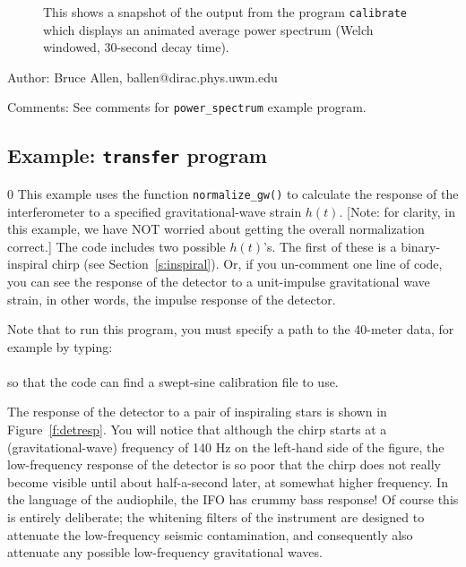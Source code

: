 \begin{figure}[hb]
\begin{center}
\caption{\label{f:calibrate} 
This shows a snapshot of the output from the program {\tt calibrate}
which displays an animated average power spectrum (Welch windowed, 30-second decay time).}
\end{center}
\end{figure}


\begin{description}
\item{Author:}
Bruce Allen, ballen@dirac.phys.uwm.edu
\item{Comments:}
See comments for {\tt power\_spectrum} example program.
\end{description}
\clearpage

\subsection{Example: {\tt transfer} program}
\label{ss:impulse-response}
\setcounter{equation}0
This example uses the function {\tt normalize\_gw()} to calculate the
response of the interferometer to a specified gravitational-wave strain
$h(t)$. [Note: for clarity, in this example, we have NOT worried about
getting the overall normalization correct.] The code includes two
possible $h(t)$'s.  The first of these is a binary-inspiral chirp (see
Section~\ref{s:inspiral}).  Or, if you un-comment one line of code, you
can see the response of the detector to a unit-impulse gravitational
wave strain, in other words, the impulse response of the detector.

Note that to run this program, you must specify
a path to the 40-meter data, for example by typing:\\
\\ 
so that the code can find a swept-sine calibration file to use.

The response of the detector to a pair of inspiraling stars is shown in
Figure~\ref{f:detresp}.  You will notice that although the chirp starts at
a (gravitational-wave) frequency of 140 Hz on the left-hand side of the
figure, the low-frequency response of the detector is so poor that the
chirp does not really become visible until about half-a-second later,
at somewhat higher frequency.  In the language of the audiophile, the
IFO has crummy bass response!  Of course this is entirely deliberate;
the whitening filters of the instrument are designed to attenuate the
low-frequency seismic contamination, and consequently also attenuate
any possible low-frequency gravitational waves.

